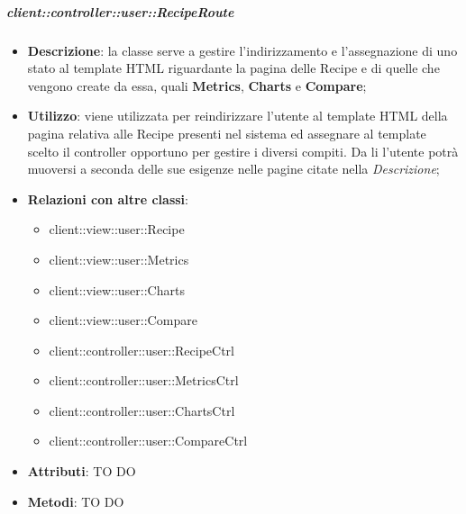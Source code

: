 		\subparagraph{client::controller::user::RecipeRoute} %
		\label{subp:bdsm_app_client_controller_user_reciperouteconfig}
			\begin{itemize}
				\item \textbf{Descrizione}: la classe serve a gestire l'indirizzamento e l'assegnazione di uno stato al template HTML riguardante la pagina delle Recipe e di quelle che vengono create da essa, quali \textbf{Metrics}, \textbf{Charts} e \textbf{Compare};
				\item \textbf{Utilizzo}: viene utilizzata per reindirizzare l'utente al template HTML della pagina relativa alle Recipe presenti nel sistema ed assegnare al template scelto il controller opportuno per gestire i diversi compiti.  Da li l'utente potrà muoversi a seconda delle sue esigenze nelle pagine citate nella \emph{Descrizione};
				\item \textbf{Relazioni con altre classi}:
					\begin{itemize}
						\item client::view::user::Recipe
						\item client::view::user::Metrics
						\item client::view::user::Charts
						\item client::view::user::Compare
						\item client::controller::user::RecipeCtrl
						\item client::controller::user::MetricsCtrl
						\item client::controller::user::ChartsCtrl
						\item client::controller::user::CompareCtrl
					\end{itemize}
				\item \textbf{Attributi}: TO DO
				\item \textbf{Metodi}: TO DO
			\end{itemize}

